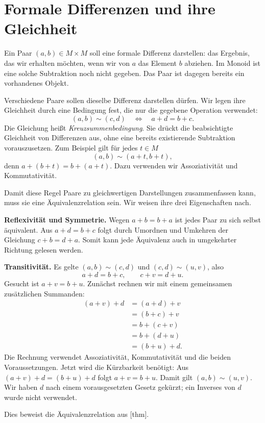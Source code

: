 \section*{Formale Differenzen und ihre Gleichheit}

Ein Paar \((a,b)\in M\times M\) soll eine formale Differenz
darstellen: das Ergebnis, das wir erhalten möchten, wenn wir von
\(a\) das Element \(b\) abziehen. Im Monoid ist eine solche
Subtraktion noch nicht gegeben. Das Paar ist dagegen bereits ein
vorhandenes Objekt.

Verschiedene Paare sollen dieselbe Differenz darstellen dürfen.
Wir legen ihre Gleichheit durch eine Bedingung fest, die nur die
gegebene Operation verwendet:
\[
  (a,b)\sim(c,d)
  \quad\Longleftrightarrow\quad
  a+d=b+c.
\]
Die Gleichung heißt \emph{Kreuzsummenbedingung}. Sie drückt die
beabsichtigte Gleichheit von Differenzen aus, ohne eine bereits
existierende Subtraktion vorauszusetzen. Zum Beispiel gilt für
jedes \(t\in M\)
\[
  (a,b)\sim(a+t,b+t),
\]
denn \(a+(b+t)=b+(a+t)\). Dazu verwenden wir Assoziativität
und Kommutativität.

Damit diese Regel Paare zu gleichwertigen Darstellungen
zusammenfassen kann, muss sie eine Äquivalenzrelation sein.
Wir weisen ihre drei Eigenschaften nach.

\medskip\noindent\textbf{Reflexivität und Symmetrie.}
Wegen \(a+b=b+a\) ist jedes Paar zu sich selbst äquivalent.
Aus \(a+d=b+c\) folgt durch Umordnen und Umkehren der Gleichung
\(c+b=d+a\). Somit kann jede Äquivalenz auch in umgekehrter
Richtung gelesen werden.

\medskip\noindent\textbf{Transitivität.}
Es gelte \((a,b)\sim(c,d)\) und \((c,d)\sim(u,v)\), also
\[
  a+d=b+c,
  \qquad c+v=d+u.
\]
Gesucht ist \(a+v=b+u\). Zunächst rechnen wir mit einem
gemeinsamen zusätzlichen Summanden:
\[
  \begin{aligned}
    (a+v)+d
      &=(a+d)+v\\
      &=(b+c)+v\\
      &=b+(c+v)\\
      &=b+(d+u)\\
      &=(b+u)+d.
  \end{aligned}
\]
Die Rechnung verwendet Assoziativität, Kommutativität und die
beiden Voraussetzungen. Jetzt wird die Kürzbarkeit benötigt:
Aus \((a+v)+d=(b+u)+d\) folgt \(a+v=b+u\).
Damit gilt \((a,b)\sim(u,v)\). Wir haben \(d\) nach einem
vorausgesetzten Gesetz gekürzt; ein Inverses von \(d\) wurde
nicht verwendet.

Dies beweist die Äquivalenzrelation aus
[thm].

